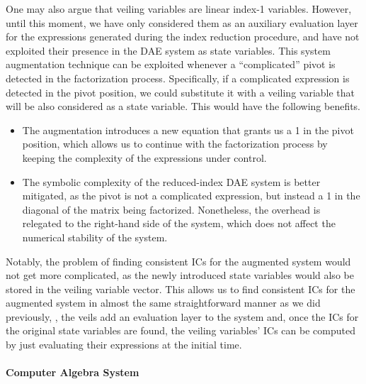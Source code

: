 One may also argue that veiling variables are linear index-1 variables. However, until this moment, we have only considered them as an auxiliary evaluation layer for the expressions generated during the index reduction procedure, and have not exploited their presence in the \ac{DAE} system as state variables. This system augmentation technique can be exploited whenever a ``complicated'' pivot is detected in the factorization process. Specifically, if a complicated expression is detected in the pivot position, we could substitute it with a veiling variable that will be also considered as a state variable. This would have the following benefits.
%
\begin{itemize}
  \setlength{\itemsep}{0pt}
  \item The augmentation introduces a new equation that grants us a 1 in the pivot position, which allows us to continue with the factorization process by keeping the complexity of the expressions under control.
  \item The symbolic complexity of the reduced-index \ac{DAE} system is better mitigated, as the pivot is not a complicated expression, but instead a 1 in the diagonal of the matrix being factorized. Nonetheless, the overhead is relegated to the right-hand side of the system, which does not affect the numerical stability of the system.
\end{itemize}

Notably, the problem of finding consistent \acp{IC} for the augmented system would not get more complicated, as the newly introduced state variables would also be stored in the veiling variable vector. This allows us to find consistent \acp{IC} for the augmented system in almost the same straightforward manner as we did previously, \ie{}, the veils add an evaluation layer to the system and, once the \acp{IC} for the original state variables are found, the veiling variables' \acp{IC} can be computed by just evaluating their expressions at the initial time.

\paragraph{Computer Algebra System}

